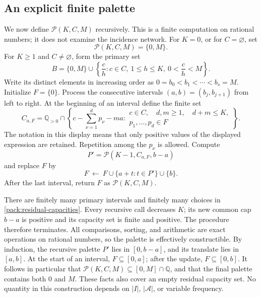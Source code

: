 \documentclass[11pt,a4paper]{article}
\theoremstyle{definition}
\theoremstyle{remark}
\begin{document}
\subsection{An explicit finite palette}

We now define $\mathcal P(K,C,M)$ recursively.  This is a finite
computation on rational numbers; it does not examine the incidence
network.  For $K=0$, or for $C=\varnothing$, set
\begin{equation}\label{pack:base-palette}
 \mathcal P(K,C,M)=\{0,M\}.
\end{equation}
For $K\geq1$ and $C\ne\varnothing$, form the primary set
\begin{equation}\label{pack:primary}
 B=\{0,M\}\cup
 \left\{\frac{c}{h}:c\in C,\ 1\leq h\leq K,
                    \ 0<\frac{c}{h}<M\right\}.
\end{equation}
Write its distinct elements in increasing order as
$0=b_0<b_1<\cdots<b_s=M$.  Initialize $F=\{0\}$.
Process the consecutive intervals $(a,b)=(b_j,b_{j+1})$ from left to
right.  At the beginning of an interval define the finite set
\begin{equation}\label{pack:residual-capacities}
 C_{a,F}=\mathbb Q_{>0}\cap\left\{
 c-\sum_{\nu=1}^{d}p_\nu-ma:
 \begin{array}{l}
 c\in C,\quad d,m\geq1,\quad d+m\leq K,\\
 p_1,\ldots,p_d\in F
 \end{array}\right\}.
\end{equation}
The notation in this display means that only positive values of the
displayed expression are retained.  Repetition among the $p_\nu$ is
allowed.  Compute
\[
 P'=\mathcal P(K-1,C_{a,F},b-a)
\]
and replace $F$ by
\begin{equation}\label{pack:palette-update}
 F\ \longleftarrow\ F\cup\{a+t:t\in P'\}\cup\{b\}.
\end{equation}
After the last interval, return $F$ as $\mathcal P(K,C,M)$.

There are finitely many primary intervals and finitely many choices in
\eqref{pack:residual-capacities}.  Every recursive call decreases $K$;
its new common cap $b-a$ is positive and its capacity set is finite and
positive.  The procedure therefore terminates.  All comparisons,
sorting, and arithmetic are exact operations on rational numbers, so
the palette is effectively constructible.  By induction, the recursive
palette $P'$ lies in $[0,b-a]$, and its translate lies in $[a,b]$.
At the start of an interval, $F\subseteq[0,a]$; after the update,
$F\subseteq[0,b]$.  It follows in particular that
$\mathcal P(K,C,M)\subseteq[0,M]\cap\mathbb Q$, and that the final
palette contains both $0$ and $M$.  These facts also cover an empty
residual capacity set.  No quantity in this construction depends on
$|I|$, $|\mathcal A|$, or variable frequency.
\end{document}
